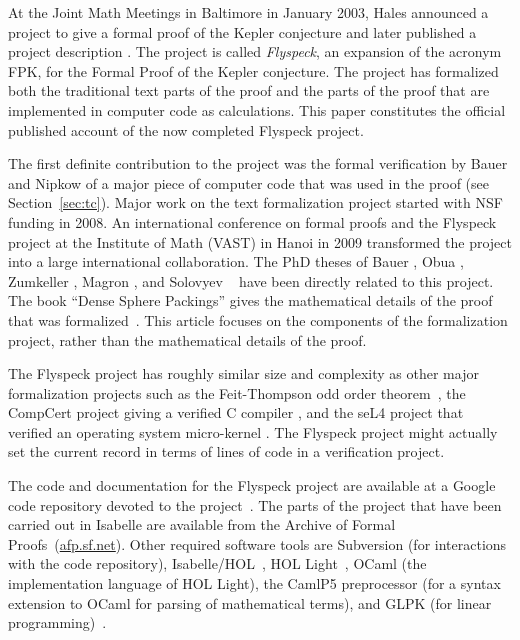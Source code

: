 At the Joint Math Meetings in Baltimore in January 2003, Hales announced a
project to give a formal proof of the Kepler conjecture and later
published a project description \cite{hales:DSP:2006:432}.
The project is called {\it Flyspeck}, an expansion of the acronym
FPK, for the Formal Proof of the Kepler conjecture.  The project has
formalized both the traditional text parts of the proof and the
parts of the proof that are implemented in computer code as
calculations.  This paper constitutes the official published account
of the now completed Flyspeck project.

The first definite contribution to the project was the formal
verification by Bauer and Nipkow of a major piece of computer code
that was used in the proof (see Section~\ref{sec:tc}).  Major work on
the text formalization project started with NSF funding in 2008.  An
international conference on formal proofs and the Flyspeck project
at the Institute of Math (VAST) in Hanoi in 2009 transformed the project
into a large international collaboration.  The PhD theses of Bauer
\cite{Bauer:2006:Thesis}, Obua \cite{Obua:2005:Thesis}, Zumkeller
\cite{roland-thesis}, Magron \cite{Magron:3013:Thesis}, and
Solovyev ~\cite{Solovyev-thesis} have been directly related to this
project.  The book ``Dense Sphere Packings'' gives the mathematical
details of the proof that was formalized~\cite{DSP}.  This article
focuses on the components of the formalization project, rather than
the mathematical details of the proof.

The Flyspeck project has roughly similar size and complexity as other
major formalization projects such as the Feit-Thompson odd order
theorem~\cite{gonthier2013machine}, the CompCert project giving a
verified C compiler \cite{CC}, and the seL4 project that verified an
operating system micro-kernel \cite{Klein-SOSP09}.  The Flyspeck
project might actually set the current record in terms of lines of
code in a verification project.  


The code and documentation for the Flyspeck project are available at a
Google code repository devoted to the
project~\cite{website:FlyspeckProject}.  The parts of the project that
have been carried out in Isabelle are available from the Archive of
Formal Proofs~(\url{afp.sf.net}).  Other required software tools are
Subversion (for interactions with the code repository),
Isabelle/HOL~\cite{LNCS2283}, HOL Light~\cite{HOLL}, OCaml (the
implementation language of HOL Light), the CamlP5 preprocessor (for a
syntax extension to OCaml for parsing of mathematical terms), and GLPK
(for linear programming)~\cite{website:GLPK}.

